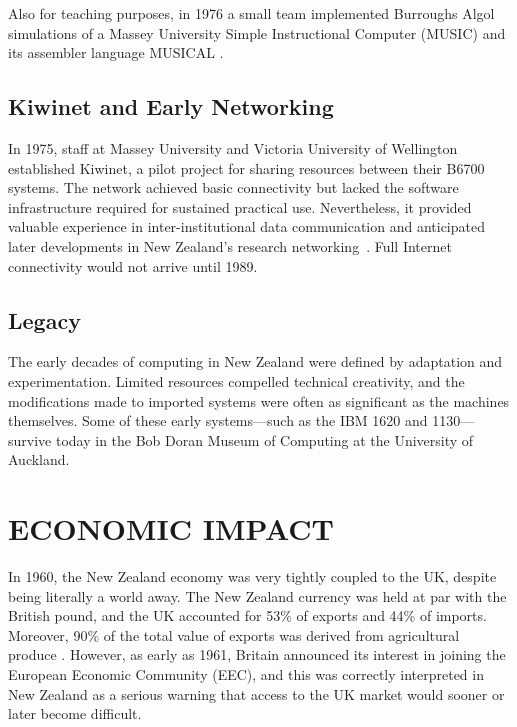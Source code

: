 \documentclass{IEEEcsmag}
\begin{document}
Also for teaching purposes, in 1976 a small team implemented Burroughs Algol simulations of a Massey University Simple Instructional Computer (MUSIC) and its assembler language MUSICAL \cite{MUSIC}.

\subsection{Kiwinet and Early Networking}
\vspace*{5pt}
In 1975, staff at Massey University and Victoria University of Wellington established Kiwinet, a pilot project for sharing resources between their B6700 systems. The network achieved basic connectivity but lacked the software infrastructure required for sustained practical use. Nevertheless, it provided valuable experience in inter-institutional data communication and anticipated later developments in New Zealand’s research networking~\cite{ConnectingClouds}. Full Internet connectivity would not arrive until 1989.

\subsection{Legacy}
\vspace*{5pt}
The early decades of computing in New Zealand were defined by adaptation and experimentation. Limited resources compelled technical creativity, and the modifications made to imported systems were often as significant as the machines themselves. Some of these early systems—such as the IBM 1620 and 1130—survive today in the Bob Doran Museum of Computing at the University of Auckland.


\vspace*{-8pt}
\section{ECONOMIC IMPACT}

In 1960, the New Zealand economy was very tightly coupled to the UK, despite being literally a world away.
The New Zealand currency was held at par with the British pound, and the UK accounted for 53\% of exports and 44\% of imports.
Moreover, 90\% of the total value of exports was derived from agricultural produce \cite{Yearbook62}. 
However, as early as 1961, Britain announced its interest in joining the European Economic Community (EEC),
and this was correctly interpreted in New Zealand as a serious warning that access to the UK market would
sooner or later become difficult. 
\end{document}
